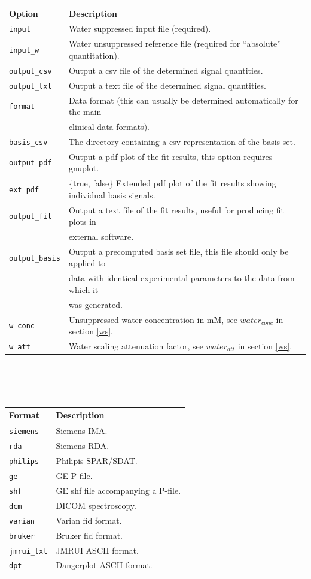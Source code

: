 \documentclass[a4paper,12pt]{article}
\begin{document}
\begin{tabular}{l l}
Option & Description \\
\hline
\texttt{input} & Water suppressed input file (required). \\
\texttt{input\_w} & Water unsuppressed reference file (required for ``absolute'' quantitation). \\
\texttt{output\_csv} & Output a csv file of the determined signal quantities. \\
\texttt{output\_txt} & Output a text file of the determined signal quantities. \\
\texttt{format} & Data format (this can usually be determined automatically for the main \\ 
& clinical data formats). \\
\texttt{basis\_csv} & The directory containing a csv representation of the basis set.\\
\texttt{output\_pdf} & Output a pdf plot of the fit results, this option requires gnuplot. \\
\texttt{ext\_pdf} & \{true, false\} Extended pdf plot of the fit results showing individual basis signals. \\
\texttt{output\_fit} & Output a text file of the fit results, useful for producing fit plots in \\ 
& external software. \\
\texttt{output\_basis} & Output a precomputed basis set file, this file should only be applied to \\ 
& data with identical experimental parameters to the data from which it \\
& was generated. \\
\texttt{w\_conc} & Unsuppressed water concentration in mM, see $water_{conc}$ in section \ref{ws}.\\ 
\texttt{w\_att} & Water scaling attenuation factor, see $water_{att}$ in section \ref{ws}.\\ 
\end{tabular}
\\
\\
\\
\noindent
\begin{tabular}{l l}
Format & Description \\
\hline
\texttt{siemens} & Siemens IMA. \\
\texttt{rda} & Siemens RDA. \\
\texttt{philips} & Philipis SPAR/SDAT. \\
\texttt{ge} & GE P-file. \\
\texttt{shf} & GE shf file accompanying a P-file. \\
\texttt{dcm} & DICOM spectroscopy. \\
\texttt{varian} & Varian fid format. \\
\texttt{bruker} & Bruker fid format. \\
\texttt{jmrui\_txt} & JMRUI ASCII format. \\
\texttt{dpt} & Dangerplot ASCII format. \\
\end{tabular}
\end{document}
